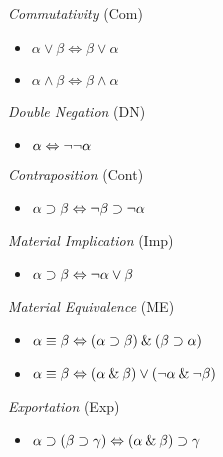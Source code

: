 \documentclass[../logic-text.tex]{subfiles}
\begin{document}
\bigskip



\emph{Commutativity} (Com)

\begin{itemize}
\item [] $\alpha \vee \beta \Leftrightarrow \beta \vee \alpha$
\item [] $\alpha \land \beta \Leftrightarrow \beta \land \alpha$  
\end{itemize}

\bigskip




\emph{Double Negation} (DN)

\begin{itemize}
\item [] $\alpha \Leftrightarrow \neg \neg \alpha$
\end{itemize}

\bigskip




\emph{Contraposition} (Cont)

\begin{itemize}
\item [] $\alpha \supset \beta \Leftrightarrow \neg \beta \supset \neg \alpha$
\end{itemize}

\bigskip




\emph{Material Implication} (Imp)

\begin{itemize}
\item [] $\alpha \supset \beta \Leftrightarrow \neg \alpha \vee \beta$
\end{itemize}

\bigskip



\emph{Material Equivalence} (ME)

\begin{itemize}
\item [] $\alpha \equiv \beta \Leftrightarrow (\alpha \supset \beta) \mathbin{\&} (\beta \supset \alpha)$
\item [] $\alpha \equiv \beta \Leftrightarrow (\alpha \mathbin{\&} \beta) \vee (\neg \alpha \mathbin{\&} \neg \beta) $
\end{itemize}

\bigskip




\emph{Exportation} (Exp)

\begin{itemize}
\item [] $\alpha \supset (\beta \supset \gamma) \Leftrightarrow (\alpha \mathbin{\&} \beta) \supset \gamma $
\end{itemize}
\end{document}
